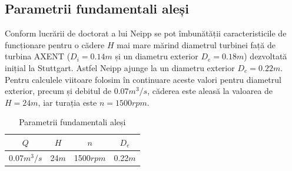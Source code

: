 \subsection{Parametrii fundamentali aleși}

Conform lucrării de doctorat a lui Neipp \cite{neipp2017zweistufige} se pot îmbunătății caracteristicile de funcționare pentru o cădere $H$ mai mare mărind diametrul turbinei față de turbina AXENT ($D_i = 0.14\si{m}$ și un diametru exterior $D_e = 0.18\si{m}$) dezvoltată inițial la Stuttgart. Astfel Neipp ajunge la un diametru exterior $D_e = 0.22\si{m}$. Pentru calculele viitoare folosim în continuare aceste valori pentru diametrul exterior, precum și debitul de $0.07\si{m^3/s}$, căderea este aleasă la valoarea de $H=24\si{m}$, iar turația este $n=1500\si{rpm}$.

\begin{table}[ht]
\caption{Parametrii fundamentali aleși}%
\centering

\begin{tabular}{ c | c | c | c }
$Q$ & $H$ & $n$ & $D_e$ \\ \hline
0.07$\si{m^3/s}$ & 24$\si{m}$ & 1500$\si{rpm}$ & 0.22$\si{m}$ \\
\end{tabular}

\end{table}

\clearpage